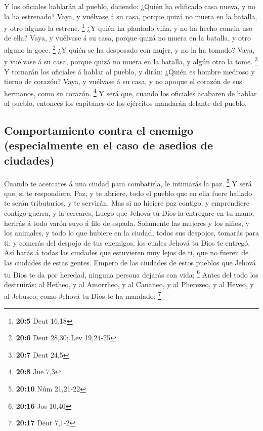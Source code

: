  Y los oficiales hablarán al pueblo, diciendo: ¿Quién ha
edificado casa nueva, y no la ha estrenado? Vaya, y vuélvase á su casa,
porque quizá no muera en la batalla, y otro alguno la estrene.
\footnote{\textbf{20:5} Deut 16,18}  ¿Y quién ha plantado
viña, y no ha hecho común uso de ella? Vaya, y vuélvase á su casa,
porque quizá no muera en la batalla, y otro alguno la goce. \footnote{\textbf{20:6}
  Deut 28,30; Lev 19,24-25}  ¿Y quién se ha desposado con
mujer, y no la ha tomado? Vaya, y vuélvase á su casa, porque quizá no
muera en la batalla, y algún otro la tome. \footnote{\textbf{20:7} Deut
  24,5}  Y tornarán los oficiales á hablar al pueblo, y
dirán: ¿Quién es hombre medroso y tierno de corazón? Vaya, y vuélvase á
su casa, y no apoque el corazón de sus hermanos, como su corazón.
\footnote{\textbf{20:8} Jue 7,3}  Y será que, cuando los
oficiales acabaren de hablar al pueblo, entonces los capitanes de los
ejércitos mandarán delante del pueblo.

\hypertarget{comportamiento-contra-el-enemigo-especialmente-en-el-caso-de-asedios-de-ciudades}{%
\subsection{Comportamiento contra el enemigo (especialmente en el caso
de asedios de
ciudades)}\label{comportamiento-contra-el-enemigo-especialmente-en-el-caso-de-asedios-de-ciudades}}

 Cuando te acercares á una ciudad para combatirla, le
intimarás la paz. \footnote{\textbf{20:10} Núm 21,21-22}  Y
será que, si te respondiere, Paz, y te abriere, todo el pueblo que en
ella fuere hallado te serán tributarios, y te servirán. 
Mas si no hiciere paz contigo, y emprendiere contigo guerra, y la
cercares,  Luego que Jehová tu Dios la entregare en tu
mano, herirás á todo varón suyo á filo de espada. 
Solamente las mujeres y los niños, y los animales, y todo lo que hubiere
en la ciudad, todos sus despojos, tomarás para ti: y comerás del despojo
de tus enemigos, los cuales Jehová tu Dios te entregó.  Así
harás á todas las ciudades que estuvieren muy lejos de ti, que no fueren
de las ciudades de estas gentes.  Empero de las ciudades de
estos pueblos que Jehová tu Dios te da por heredad, ninguna persona
dejarás con vida; \footnote{\textbf{20:16} Jos 10,40} 
Antes del todo los destruirás: al Hetheo, y al Amorrheo, y al Cananeo, y
al Pherezeo, y al Heveo, y al Jebuseo; como Jehová tu Dios te ha
mandado: \footnote{\textbf{20:17} Deut 7,1-2}

